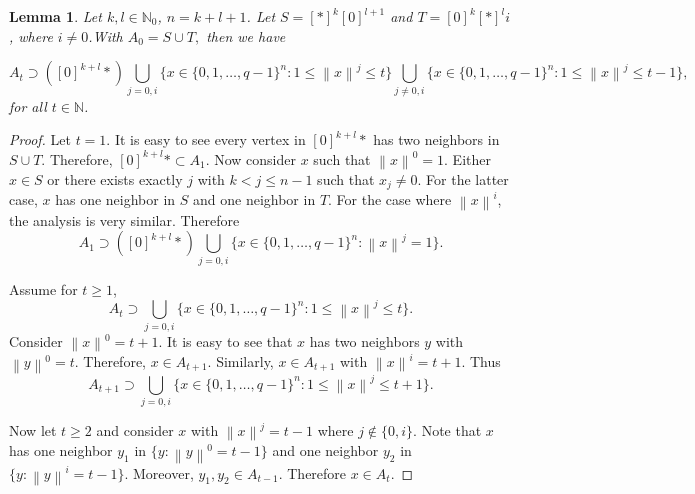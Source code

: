 \documentclass[reqno,11pt]{amsart}
\newtheorem{lemma}[theorem]{Lemma}
\renewcommand{\leq}{\leqslant}
\renewcommand{\geq}{\geqslant}
\begin{document}
\begin{lemma} \label{lemma:ST2}
Let $k,l \in \mathbb{N}_0$, $n=k+l+1$. Let $S=[*]^k[0]^{l+1}$ and $T=[0]^k[*]^li$, where $i \neq 0$.With $A_0=S \cup T,$ then we have

$$A_t \supset \left([0]^{k+l}* \right) \bigcup_{j=0,i} \{x \in \{0,1,\dots,q-1\}^n: 1 \leq \left \lVert x \right \rVert^{j} \leq t\} \bigcup_{j \neq 0,i} \{x \in \{0,1,\dots,q-1\}^n: 1 \leq \left \lVert x \right \rVert^{j} \leq t-1\},  $$ 
for all $t \in \mathbb{N} $.
\end{lemma}
\begin{proof}
Let $t=1$. It is easy to see every vertex in $[0]^{k+l}*$ has two neighbors in $ S \cup T$. Therefore, $[0]^{k+l}* \subset A_1$. 
Now consider $x$ such that $\left \lVert x \right \rVert^0=1$. Either $x \in S$ or there exists exactly $j$ with $ k<j \leq n-1$ such that $x_j \neq 0 $. For the latter case, $x$ has one neighbor in $S$ and one neighbor in $T$. 
For the case where $\left \lVert x \right \rVert^{i}$, the analysis is very similar. 
Therefore $$A_1 \supset \left([0]^{k+l}* \right) \bigcup_{j=0,i} \{x \in \{0,1,\dots,q-1\}^n: \left \lVert x \right \rVert^{j}=1\}. $$

Assume for $t \geq 1$, 
$$A_t \supset \bigcup_{j=0,i} \{x \in \{0,1,\dots,q-1\}^n: 1 \leq \left \lVert x \right \rVert^{j} \leq t\}.$$
Consider $\left \lVert x \right \rVert^0=t+1$. It is easy to see that $x$ has two neighbors $y$ with $\left \lVert y \right \rVert^0=t$. Therefore, $x \in A_{t+1}$. Similarly, $x \in A_{t+1}$ with $\left \lVert x \right \rVert^i=t+1$. Thus 
$$A_{t+1} \supset \bigcup_{j=0,i} \{x \in \{0,1,\dots,q-1\}^n: 1 \leq \left \lVert x \right \rVert^{j} \leq t+1\}.$$

Now let $t\geq 2$ and consider $x$ with $\left \lVert x \right \rVert^{j}=t-1$ where $j \notin \{0,i\}$. Note that $x$ has one neighbor $y_1$ in $\{y: \left \lVert y \right \rVert^{0}=t-1\}$ and one neighbor $y_2$ in $\{y: \left \lVert y \right \rVert^{i}=t-1\}$. Moreover, $y_1,y_2 \in A_{t-1}$. Therefore $x \in A_{t}$. 
\end{proof}
\end{document}

